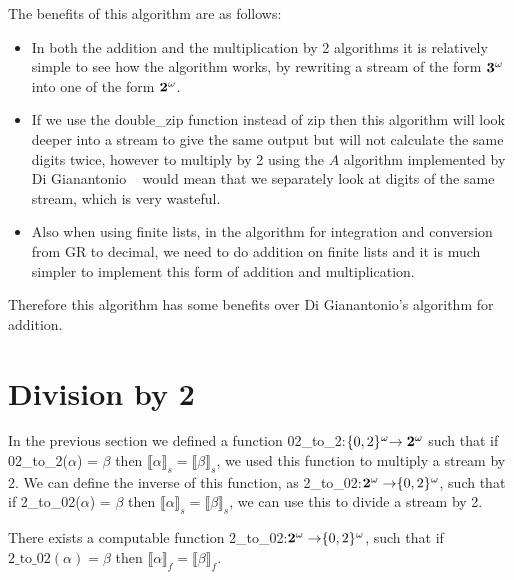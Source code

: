 \documentclass{cs4rep}
\begin{document}
The benefits of this algorithm are as follows:

\begin{itemize}
\item In both the addition and the multiplication by 2 algorithms
  it is relatively simple to see how the algorithm works, by rewriting
  a stream of the form ${\bf 3}^{\omega}$ into one of the form ${\bf
    2}^{\omega}$.
\item If we use the double\_zip function instead of zip then this
  algorithm will look deeper into a stream to give the same output but
  will not calculate the same digits twice, however to multiply by 2
  using the $A$ algorithm implemented by Di Gianantonio
 ~\cite{kn:DiGianantonio} would mean that we separately look at digits of
  the same stream, which is very wasteful.
\item Also when using finite lists, in the algorithm for integration
  and conversion from GR to decimal, we need to do addition on finite
  lists and it is much simpler to implement this form of addition and
  multiplication.
\end{itemize}

Therefore this algorithm has some benefits over Di Gianantonio's algorithm for addition.

\section{Division by 2} \label{sec:div2}
In the previous section we defined a function 02\_to\_2:$\{0,2\}^{\omega}
{\bf \rightarrow 2^{\omega}}$ such that if 02\_to\_2($\alpha$) = $\beta$
then $\llbracket \alpha \rrbracket_{s} = \llbracket \beta
\rrbracket_{s}$, we used this function to multiply a stream by 2.  We
can define the inverse of this function, as 2\_to\_02:${\bf 2^{\omega}
  \rightarrow} \{0,2\}^{\omega}$, such that if 2\_to\_02($\alpha$) =
$\beta$ then $\llbracket \alpha \rrbracket_{s} = \llbracket \beta
\rrbracket_{s}$, we can use this to divide a stream by 2.

\begin{myprop}
  There exists a computable function 2\_to\_02:${\bf 2^{\omega}
    \rightarrow} \{0,2\}^{\omega}$, such that if
  $\mbox{2\_to\_02}(\alpha)=\beta$ then $\llbracket \alpha
  \rrbracket_{f} = \llbracket \beta \rrbracket_{f}$.
\end{myprop}
\end{document}
